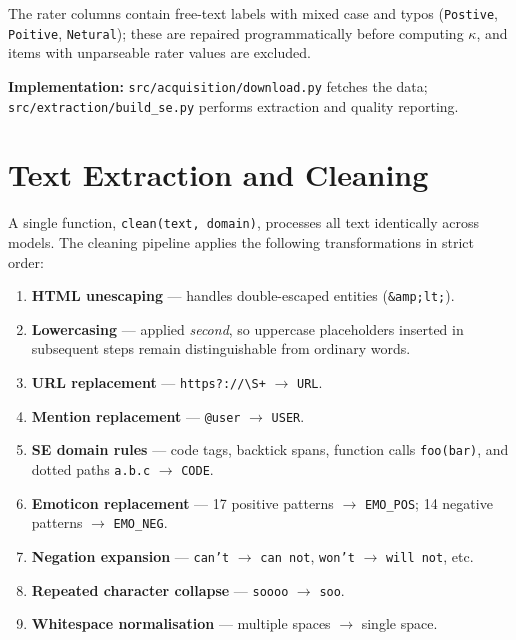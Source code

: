 \documentclass[11pt,a4paper]{article}
\begin{document}
The rater columns contain free-text labels with mixed case and typos (\texttt{Postive}, \texttt{Poitive}, \texttt{Netural}); these are repaired programmatically before computing $\kappa$, and items with unparseable rater values are excluded.

\textbf{Implementation:} \texttt{src/acquisition/download.py} fetches the data; \texttt{src/extraction/build\_se.py} performs extraction and quality reporting.

\section{Text Extraction and Cleaning}
\label{sec:extraction}

A single function, \texttt{clean(text, domain)}, processes all text identically across models. The cleaning pipeline applies the following transformations in strict order:

\begin{enumerate}[leftmargin=*]
    \item \textbf{HTML unescaping} --- handles double-escaped entities (\texttt{\&amp;lt;}).
    \item \textbf{Lowercasing} --- applied \textit{second}, so uppercase placeholders inserted in subsequent steps remain distinguishable from ordinary words.
    \item \textbf{URL replacement} --- \texttt{https?://\textbackslash S+} $\rightarrow$ \texttt{URL}.
    \item \textbf{Mention replacement} --- \texttt{@user} $\rightarrow$ \texttt{USER}.
    \item \textbf{SE domain rules} --- code tags, backtick spans, function calls \texttt{foo(bar)}, and dotted paths \texttt{a.b.c} $\rightarrow$ \texttt{CODE}.
    \item \textbf{Emoticon replacement} --- 17 positive patterns $\rightarrow$ \texttt{EMO\_POS}; 14 negative patterns $\rightarrow$ \texttt{EMO\_NEG}.
    \item \textbf{Negation expansion} --- \texttt{can't} $\rightarrow$ \texttt{can not}, \texttt{won't} $\rightarrow$ \texttt{will not}, etc.
    \item \textbf{Repeated character collapse} --- \texttt{soooo} $\rightarrow$ \texttt{soo}.
    \item \textbf{Whitespace normalisation} --- multiple spaces $\rightarrow$ single space.
\end{enumerate}
\end{document}
